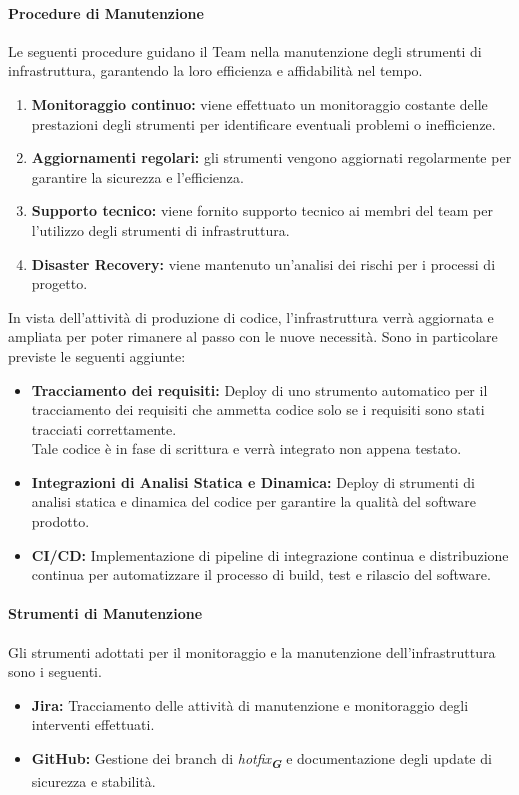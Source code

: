 \documentclass[a4paper,12pt]{article}
\newcommand{\glossario}[1]{\textit{#1}\textsubscript{\textbf{\textit{\textcolor{lightblack}{G}}}}}
\begin{document}
\paragraph{Procedure di Manutenzione}
Le seguenti procedure guidano il Team nella manutenzione degli strumenti di
infrastruttura, garantendo la loro efficienza e affidabilità nel tempo.
\begin{enumerate}
    \item \textbf{Monitoraggio continuo:} viene effettuato un monitoraggio costante delle prestazioni degli strumenti per identificare eventuali problemi o inefficienze.
    \item \textbf{Aggiornamenti regolari:} gli strumenti vengono aggiornati regolarmente per garantire la sicurezza e l'efficienza.
    \item \textbf{Supporto tecnico:} viene fornito supporto tecnico ai membri del team per l'utilizzo degli strumenti di infrastruttura.
    \item \textbf{Disaster Recovery:} viene mantenuto un'analisi dei rischi per i processi di progetto.
\end{enumerate}
In vista dell'attività di produzione di codice, l'infrastruttura verrà aggiornata e ampliata per poter rimanere al passo con le nuove necessità.
Sono in particolare previste le seguenti aggiunte:
\begin{itemize}
    \item \textbf{Tracciamento dei requisiti:} Deploy di uno strumento automatico per il tracciamento dei requisiti che ammetta codice solo se i requisiti sono stati tracciati correttamente.\\ Tale codice è in fase di scrittura e verrà integrato non appena testato.
    \item \textbf{Integrazioni di Analisi Statica e Dinamica:} Deploy di strumenti di analisi statica e dinamica del codice per garantire la qualità del software prodotto.
    \item \textbf{CI/CD:} Implementazione di pipeline di integrazione continua e distribuzione continua per automatizzare il processo di build, test e rilascio del software.
\end{itemize}

\paragraph{Strumenti di Manutenzione}
Gli strumenti adottati per il monitoraggio e la manutenzione dell'infrastruttura sono i seguenti.
\begin{itemize}
    \item \textbf{Jira:} Tracciamento delle attività di manutenzione e monitoraggio degli interventi effettuati.
    \item \textbf{GitHub:} Gestione dei branch di \glossario{hotfix} e documentazione degli update di sicurezza e stabilità.
\end{itemize}
\end{document}
